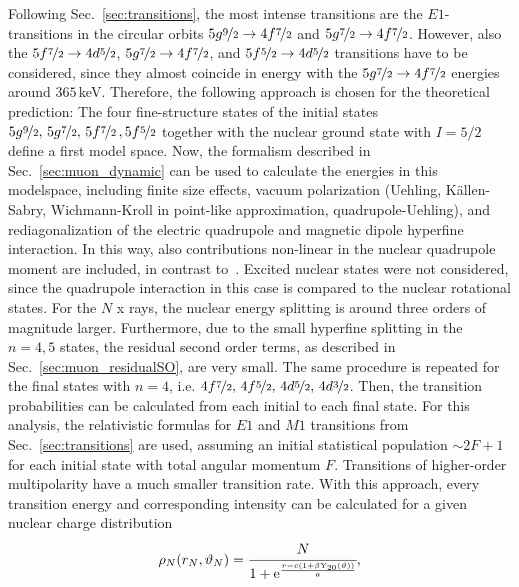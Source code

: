 Following Sec.~\ref{sec:transitions}, the most intense transitions are the $E1$-transitions in the circular orbits $5g\nicefrac{9}{2}\rightarrow4f\nicefrac{7}{2}$ and $5g\nicefrac{7}{2}\rightarrow4f\nicefrac{7}{2}$. However, also the $5f\nicefrac{7}{2}\rightarrow4d\nicefrac{5}{2}$, $5g\nicefrac{7}{2}\rightarrow 4f\nicefrac{7}{2}$, and $5f\nicefrac{5}{2}\rightarrow 4d\nicefrac{5}{2}$ transitions have to be considered, since they almost coincide in energy with the $5g\nicefrac{7}{2}\rightarrow4f\nicefrac{7}{2}$ energies around $365\,$keV. Therefore, the following approach is chosen for the theoretical prediction: The four fine-structure states of the initial states $5g\nicefrac{9}{2},\,5g\nicefrac{7}{2},\,5f\nicefrac{7}{2}\,,5f\nicefrac{5}{2}$ together with the nuclear ground state with $I=5/2$ define a first model space. Now, the formalism described in Sec.~\ref{sec:muon_dynamic} can be used to calculate the energies in this modelspace, including finite size effects, vacuum polarization (Uehling, Källen-Sabry, Wichmann-Kroll in point-like approximation, quadrupole-Uehling), and rediagonalization of the electric quadrupole and magnetic dipole hyperfine interaction. In this way, also contributions non-linear in the nuclear quadrupole moment are included, in contrast to~\cite{konijn1979}.  
Excited nuclear states were not considered, since the quadrupole interaction in this case is compared to the nuclear rotational states. For the $N$ x rays, the nuclear energy splitting is around three orders of magnitude larger. Furthermore, due to the small hyperfine splitting in the ${n}{=}{4,5}$ states, the residual second order terms, as described in Sec.~\ref{sec:muon_residualSO}, are very small.
The same procedure is repeated for the final states with ${n}{=}{4}$, i.e. $4f\nicefrac{7}{2},\,4f\nicefrac{5}{2},\,4d\nicefrac{5}{2},\,4d\nicefrac{3}{2}$. 
Then, the transition probabilities can be calculated from each initial to each final state. For this analysis, the relativistic formulas for $E1$ and $M1$ transitions from Sec.~\ref{sec:transitions} are used, assuming an initial statistical population $\sim 2F+1$ for each initial state with total angular momentum $F$. Transitions of higher-order multipolarity have a much smaller transition rate. With this approach, every transition energy and corresponding intensity can be calculated for a given nuclear charge distribution
\begin{equation}
\rho_N(r_N,\vartheta_N)=\cfrac{N}{1+\text{e}^{\frac{r-c(1+\beta \text{Y}_{20}(\vartheta))}{a}}},
\end{equation}
